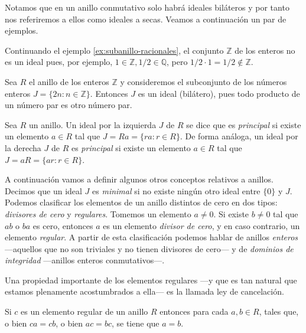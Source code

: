 Notamos que en un anillo conmutativo solo habrá ideales biláteros y por tanto nos referiremos a ellos como ideales a secas.
Veamos a continuación un par de ejemplos.

\begin{example}
  Continuando el ejemplo \ref{ex:subanillo-racionales}, el conjunto \(\mathbb Z\) de los enteros no es un ideal pues, por ejemplo, \(1 \in \mathbb Z, 1/2 \in \mathbb Q\), pero \(1/2 \cdot 1 = 1/2 \notin \mathbb Z\).
\end{example}

\begin{example}
  Sea \(R\) el anillo de los enteros \(\mathbb Z\) y consideremos el subconjunto de los números enteros \(J = \{2n : n \in \mathbb Z\}\).
  Entonces \(J\) es un ideal (bilátero), pues todo producto de un número par es otro número par.
\end{example}

\begin{definition}
  Sea \(R\) un anillo. Un ideal por la izquierda \(J\) de \(R\) se dice que es \textit{principal} si existe un elemento \(a \in R\) tal que \(J = Ra = \{ra : r \in R\}\).
  De forma análoga, un ideal por la derecha \(J\) de \(R\) es \textit{principal} si existe un elemento \(a \in R\) tal que \(J = aR = \{ar : r \in R\}\).
\end{definition}

A continuación vamos a definir algunos otros conceptos relativos a anillos.
Decimos que un ideal \(J\) es \textit{minimal} si no existe ningún otro ideal entre \(\{0\}\) y \(J\).
Podemos clasificar los elementos de un anillo distintos de cero en dos tipos: \textit{divisores de cero} y \textit{regulares}.
Tomemos un elemento \(a \neq 0\).
Si existe \(b \neq 0\) tal que \(ab\) o \(ba\) es cero, entonces \(a\) es un elemento \textit{divisor de cero}, y en caso contrario, un elemento \textit{regular}.
A partir de esta clasificación podemos hablar de anillos \textit{enteros} —aquellos que no son triviales y no tienen divisores de cero— y de \textit{dominios de integridad} —anillos enteros conmutativos—.

Una propiedad importante de los elementos regulares —y que es tan natural que estamos plenamente acostumbrados a ella— es la llamada ley de cancelación.
\begin{proposition}
  Si \(c\) es un elemento regular de un anillo \(R\) entonces para cada \(a, b \in R\), tales que, o bien \(ca = cb\), o bien \(ac = bc\), se tiene que \(a = b\).
\end{proposition}

